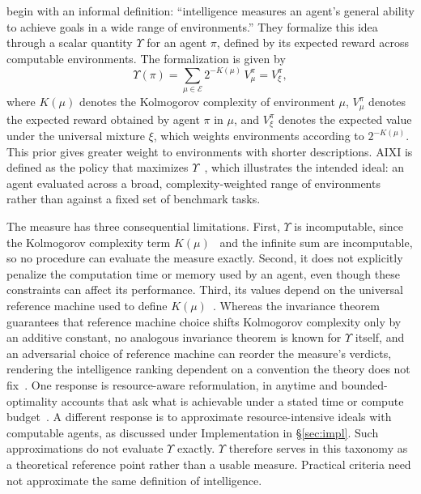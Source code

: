 \documentclass[acmsmall,screen,review,anonymous]{acmart}
\begin{document}
\citet{legghutter2007} begin with an informal definition: ``intelligence measures an agent's general ability to achieve goals in a wide range of environments.''
%
They formalize this idea through a scalar quantity $\Upsilon$ for an agent $\pi$, defined by its expected reward across computable environments.
%
The formalization is given by
\begin{equation}
  \Upsilon(\pi) = \sum_{\mu \in \mathcal{E}} 2^{-K(\mu)}\, V^{\pi}_{\mu} = V^{\pi}_{\xi},
\end{equation}
%
where $K(\mu)$ denotes the Kolmogorov complexity of environment $\mu$, $V^{\pi}_{\mu}$ denotes the expected reward obtained by agent $\pi$ in $\mu$, and $V^{\pi}_{\xi}$ denotes the expected value under the universal mixture $\xi$, which weights environments according to $2^{-K(\mu)}$.
%
This prior gives greater weight to environments with shorter descriptions.
%
AIXI is defined as the policy that maximizes $\Upsilon$~\citep{hutter2005universal}, which illustrates the intended ideal: an agent evaluated across a broad, complexity-weighted range of environments rather than against a fixed set of benchmark tasks.
 
The measure has three consequential limitations.
%
First, $\Upsilon$ is incomputable, since the Kolmogorov complexity term $K(\mu)$~\citep{Kolmogorov1968ThreeAT} and the infinite sum are incomputable, so no procedure can evaluate the measure exactly. 
%
Second, it does not explicitly penalize the computation time or memory used by an agent, even though these constraints can affect its performance.
%
Third, its values depend on the universal reference machine used to define $K(\mu)$~\citep{leike2015computeaixi}.
%
Whereas the invariance theorem guarantees that reference machine choice shifts Kolmogorov complexity only by an additive constant, no analogous invariance theorem is known for $\Upsilon$ itself, and an adversarial choice of reference machine can reorder the measure's verdicts, rendering the intelligence ranking dependent on a convention the theory does not fix~\citep{pmlr-v40-Leike15}. 
%
One response is resource-aware reformulation, in anytime and bounded-optimality accounts that ask what is achievable under a stated time or compute budget~\citep{HERNANDEZORALLO20101508, hernandezorallo2017}.
%
A different response is to approximate resource-intensive ideals with computable agents, as discussed under Implementation in \S\ref{sec:impl}.
%
Such approximations do not evaluate $\Upsilon$ exactly.
%
$\Upsilon$ therefore serves in this taxonomy as a theoretical reference point rather than a usable measure. 
%
Practical criteria need not approximate the same definition of intelligence.
\end{document}
